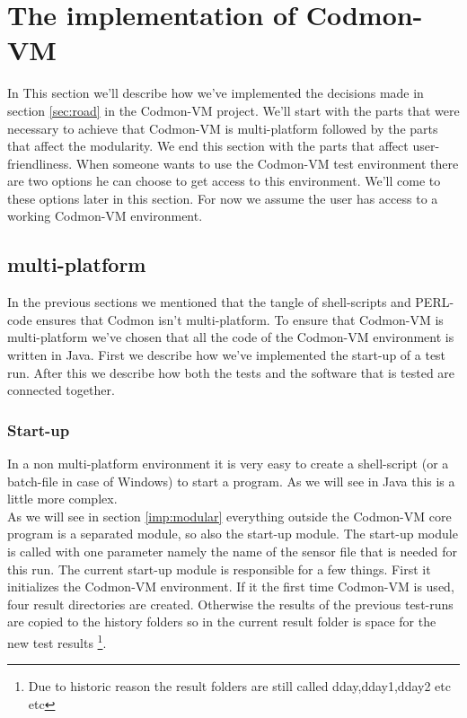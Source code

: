 \documentclass{article}
\newcommand{\project}{Codmon-VM}
\begin{document}
\newpage
\section{The implementation of \project{}}
\label{sec:Codmon2.0}
In This section we'll describe how we've implemented the decisions made in section \ref{sec:road} in the \project{} project. We'll start with the parts that were necessary to achieve that \project{} is multi-platform 
followed by the parts that affect the modularity. We end this section with the parts that affect user-friendliness. When someone wants to use the \project{} test environment there are two options he can choose 
to get access to this environment. We'll come to these options later in this section. For now we assume the user has access to a working \project{} environment.

\subsection{multi-platform}
\label{imp:multi}
In the previous sections we mentioned that the tangle of shell-scripts and PERL-code ensures that Codmon isn't multi-platform. To ensure that \project{} is multi-platform we've chosen that all the code of the 
\project{} environment is written in Java. First we describe how we've implemented the start-up of a test run. After this we describe how both the tests and the software that is tested are connected together.

\subsubsection{Start-up}
\label{imp:start}
In a non multi-platform environment it is very easy to create a shell-script (or a batch-file in case of Windows) to start a program. As we will see in Java this is a little more complex.\\

\noindent As we will see in section \ref{imp:modular} everything outside the \project{} core program is a separated module, so also the start-up module. The start-up module is called with one parameter namely 
the name of the sensor file that is needed for this run. The current start-up module is responsible for a few things. First it initializes the \project{} environment. If it the first time \project{} is used, 
four result directories are created. Otherwise the results of the previous test-runs are copied to the history folders so in the current result folder is space for the new test results \footnote{Due to historic 
reason the result folders are still called dday,dday1,dday2 etc etc}.\\
\end{document}
